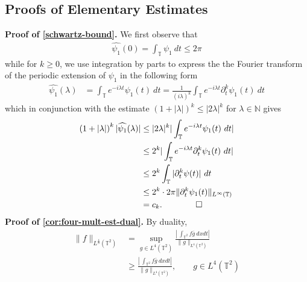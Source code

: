 \documentclass[12pt,reqno]{amsart}
\newcommand{\wh}{\widehat}
\newcommand{\p}{\partial}
\newcommand{\ci}{\mathbb{T}}
\theoremstyle{plain}  %
\begin{document}
\begin{appendices}

\section{Proofs of Elementary Estimates}

{\bf Proof of \eqref{schwartz-bound}.} We first observe that
\begin{equation*}
	\begin{split}
		\wh{\psi_1}(0) = \int_\ci \psi_1 \ dt \le 2 \pi 
	\end{split}
\end{equation*}
%
%
while for $k \ge 0$, we use integration by parts to express the 
the Fourier transform of the periodic extension of $\psi_1$ 
in the following form
%
%
\begin{equation*}
	\begin{split}
		\wh{\psi_1}(\lambda) 
		& = \int_\ci e^{-i \lambda t} \psi_1 (t) \ dt
		= \frac{1}{\left( i \lambda \right)^k } \int_\ci e^{-i \lambda t} 
		\p_t^k \psi_1(t) \ dt
	\end{split}
\end{equation*}
%
%
which in conjunction with the estimate $\left( 1 + |\lambda|  \right)^{k } \le |2 \lambda|^k$ for $\lambda \in \mathbb{N}$ 
gives
%
%
\begin{equation*}
	\begin{split}
		\left( 1 + |\lambda| \right)^k |\wh{\psi_1}(\lambda)|
		& \le |2 \lambda|^k | \int_\ci e^{-i \lambda t} \psi_1(t) \ dt |
		\\
		& \le 2 ^k | \int_\ci e^{-i \lambda t} \p_t^k \psi_1(t) \ dt|
		\\
		& \le 2^k \int_\ci | \p_t^k \psi(t) | \ dt 
		\\
		& \le 2^k \cdot 2 \pi  \|\p_t^k \psi_1(t) \|_{L^\infty(\ci)}
		\\
		& = c_k.  \qquad \qed
	\end{split}
\end{equation*}
%
%
%
%
\vskip0.1in
{\bf Proof of \autoref{cor:four-mult-est-dual}.}
By duality,
%
%
\begin{equation}
	\label{1g}
	\begin{split}
		\|f\|_{L^{\frac{4}{3}}(\ci^2)}
		& = \sup_{g \in L^4(\ci^2)} 
		\frac{|\ \int_{\ci^2} f \bar{g} \ dx dt|}{\|g\|_{L^4(\ci^2)}}
		\\
		& \ge \frac{|\ \int_{\ci^2} f \bar{g} \ dx 
		dt|}{\|g\|_{L^4(\ci^2)}}, \qquad g \in L^4(\ci^2)
		\\

\end{split}
\end{equation}
\end{appendices}
\end{document}
